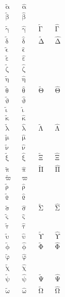 \begin{align*}
  \tilde{\upalpha}    && \hat{\upalpha} \\
  \tilde{\upbeta}     && \hat{\upbeta}  \\
  \tilde{\upgamma}    && \hat{\upgamma} && \tilde{\upGamma} && \hat{\upGamma} \\
  \tilde{\updelta}    && \hat{\updelta} && \tilde{\upDelta} && \hat{\upDelta} \\
  \tilde{\upvarepsilon} &&\hat{\upvarepsilon} \\
  \tilde{\upepsilon}  && \hat{\upepsilon} \\
  \tilde{\upzeta}     && \hat{\upzeta} \\
  \tilde{\upeta}      && \hat{\upeta}  \\
  \tilde{\uptheta}    && \hat{\uptheta} && \tilde{\upTheta} && \hat{\upTheta} \\
  \tilde{\upvartheta} &&\hat{\upvartheta} \\
  \tilde{\upiota}     && \hat{\upiota} \\
  \tilde{\upkappa}    && \hat{\upkappa} \\
  \tilde{\uplambda}   &&\hat{\uplambda} &&\tilde{\upLambda} &&\hat{\upLambda} \\
  \tilde{\upmu}       &&\hat{\upmu} \\
  \tilde{\upnu}       &&\hat{\upnu} \\
  \tilde{\upxi}       &&\hat{\upxi}     &&\tilde{\upXi}     &&\hat{\upXi} \\
  \tilde{\uppi}       &&\hat{\uppi}     &&\tilde{\upPi}     &&\hat{\upPi} \\
  \tilde{\upvarpi}    && \hat{\upvarpi} \\
  \tilde{\uprho}      && \hat{\uprho} \\
  \tilde{\upvarrho}   &&\hat{\upvarrho} \\
  \tilde{\upsigma}    && \hat{\upsigma} && \tilde{\upSigma} && \hat{\upSigma} \\
  \tilde{\upvarsigma} && \hat{\upvarsigma} \\
  \tilde{\uptau}      && \hat{\uptau} \\
  \tilde{\upupsilon}  && \hat{\upupsilon} && \tilde{\upUpsilon} && \hat{\upUpsilon} \\
  \tilde{\upphi}      && \hat{\upphi}   && \tilde{\upPhi} && \hat{\upPhi} \\
  \tilde{\upvarphi}   &&\hat{\upvarphi} \\
  \tilde{\upchi}      && \hat{\upchi} \\
  \tilde{\uppsi}      && \hat{\uppsi}   && \tilde{\upPsi}   && \hat{\upPsi} \\
  \tilde{\upomega}    && \hat{\upomega} && \tilde{\upOmega} && \hat{\upOmega}
\end{align*}


